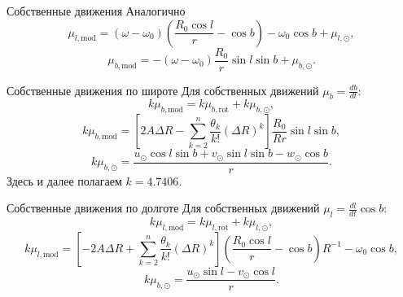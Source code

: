 \documentclass{beamer}
\begin{document}
\begin{frame}{Собственные движения}
Аналогично
\begin{equation}
        \mu_{l, \mathrm{mod}} = (\omega - \omega_0) \left( \frac{R_0\cos{l}}{r} - \cos{b} \right) - \omega_0 \cos{b} + \mu_{l, \odot},
\end{equation}
\begin{equation}
        \mu_{b, \mathrm{mod}} = - (\omega - \omega_0) \frac{R_0}{r} \sin{l} \sin{b} + \mu_{b, \odot}.
\end{equation}

\end{frame}


\begin{frame}{Собственные движения по широте}
Для собственных движений $\mu_b = \frac{db}{dt}$:
	\begin{equation}
		k\mu_{b, \mathrm{mod}} = k\mu_{b, \mathrm{rot}} + k\mu_{b, \odot},
	\end{equation}
	\begin{equation}
		k\mu_{b, \mathrm{mod}} = \left[ 2A\Delta R - \sum^n_{k = 2} \frac{\theta_k}{k!} \left( \Delta R \right)^k \right] \frac{R_0}{Rr} \sin{l} \sin{b},
	\end{equation}
	\begin{equation}
                k\mu_{b, \odot} = \frac{u_{\odot}\cos{l}\sin{b} + v_{\odot}\sin{l}\sin{b} - w_{\odot}\cos{b}}{r}.
	\end{equation}
        Здесь и далее полагаем $k=4.7406$.
\end{frame}

\begin{frame}{Собственные движения по долготе}
Для собственных движений $\mu_l = \frac{dl}{dt}\cos{b}$:
	\begin{equation}
		k\mu_{l, \mathrm{mod}} = k\mu_{l, \mathrm{rot}} + k\mu_{l, \odot},
	\end{equation}
	\begin{equation}
                k\mu_{l, \mathrm{mod}} = \left[ -2A\Delta R + \sum^n_{k = 2} \frac{\theta_k}{k!} \left( \Delta R \right)^k \right] \left( \frac{R_0\cos{l}}{r} - \cos{b} \right) R^{-1} - \omega_0 \cos{b},
	\end{equation}
	\begin{equation}
                k\mu_{b, \odot} = \frac{u_{\odot}\sin{l}- v_{\odot}\cos{l}}{r}.
	\end{equation}
\end{frame}
\end{document}
